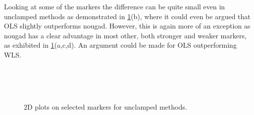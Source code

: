 Looking at some of the markers the difference can be quite small even in unclamped methods as demonstrated in \cref{fig:bld}(b), where it could even be argued that OLS slightly outperforms nougad. However, this is again more of an exception as nougad has a clear advantage in most other, both stronger and weaker markers, as exhibited in \cref{fig:bld}(a,c,d). An argument could be made for OLS outperforming WLS.

\begin{figure}
  \centering
  \\
  \\
  \\
  \caption{2D plots on selected markers for unclamped methods.}
  \label{fig:bld}
\end{figure}




